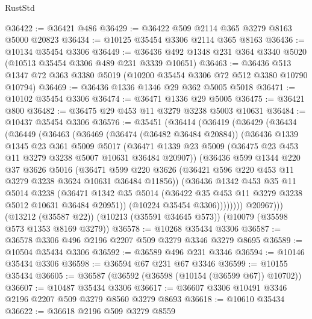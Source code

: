 \begin{lexlean}{RustStd}
\begin{coremodule}
{\begin{coremodule}
{{{{{{{{{{{{{{{{{{{{{{{{{{@36422 := @36421 @486
@36429 := @36422 @509 @2114 @365 @3279 @8163 @5000 @20823
@36434 := @10125 @35454 @3306 @2114 @365 @8163
@36436 := @10134 @35454 @3306
@36449 := @36436 @492 @1348 @231 @364 @3340 @5020 (@10513 @35454 @3306 @489 @231 @3339 @10651)
@36463 := @36436 @513 @1347 @72 @363 @3380 @5019 (@10200 @35454 @3306 @72 @512 @3380 @10790 @10794)
@36469 := @36436 @1336 @1346 @29 @362 @5005 @5018
@36471 := @10102 @35454 @3306
@36474 := @36471 @1336 @29 @5005
@36475 := @36421 @800
@36482 := @36475 @29 @453 @11 @3279 @3238 @5003 @10631
@36484 := @10437 @35454 @3306
@36576 := @35451
    (@36414
      (@36419
        (@36429
          (@36434
            (@36449
              (@36463
                (@36469
                  (@36474 (@36482 @36484 @20884))
                  (@36436
                    @1339
                    @1345
                    @23
                    @361
                    @5009
                    @5017
                    (@36471
                      @1339
                      @23
                      @5009
                      (@36475 @23 @453 @11 @3279 @3238 @5007 @10631 @36484 @20907))
                    (@36436
                      @599
                      @1344
                      @220
                      @37
                      @3626
                      @5016
                      (@36471
                        @599
                        @220
                        @3626
                        (@36421 @596 @220 @453 @11 @3279 @3238 @3624 @10631 @36484 @11856))
                      (@36436
                        @1342
                        @453
                        @35
                        @11
                        @5014
                        @3238
                        (@36471
                          @1342
                          @35
                          @5014
                          (@36422 @35 @453 @11 @3279 @3238 @5012 @10631 @36484 @20951))
                        (@10224 @35454 @3306))))))))
          @20967)))
    (@13212 (@35587 @22))
    (@10213 (@35591 @34645 @573))
    (@10079 (@35598 @573 @1353 @8169 @3279))
@36578 := @10268 @35434 @3306
@36587 := @36578 @3306 @496 @2196 @2207 @509 @3279 @3346 @3279 @8695
@36589 := @10504 @35434 @3306
@36592 := @36589 @496 @231 @3346
@36594 := @10146 @35434 @3306
@36598 := @36594 @67 @231 @67 @3346
@36599 := @10155 @35434
@36605 := @36587 (@36592 (@36598 (@10154 (@36599 @67)) @10702))
@36607 := @10487 @35434 @3306
@36617 := @36607 @3306 @10491 @3346 @2196 @2207 @509 @3279 @8560 @3279 @8693
@36618 := @10610 @35434
@36622 := @36618 @2196 @509 @3279 @8559
}}}}}}}}}}}}}}}}}}}}}}}}}}
\end{coremodule}}
\end{coremodule}
\end{lexlean}
